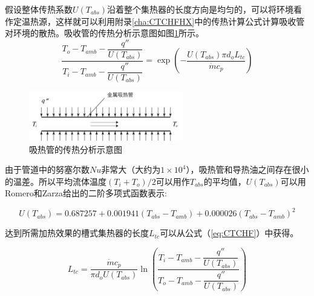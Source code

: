 
假设整体传热系数$U(T_{abs})$沿着整个集热器的长度方向是均匀的，可以将环境看作定温热源，这样就可以利用附录\ref{cha:CTCHFHX}中的传热计算公式计算吸收管对环境的散热。吸收管的传热分析示意图如图\ref{fig:Pipe}所示。
\begin{equation}
	\frac{T_{o}-T_{amb}-\dfrac{q''}{U(T_{abs})}}{T_{i}-T_{amb}-\dfrac{q''}{U(T_{abs})}}=\exp(-\frac{U(T_{abs})\pi d_o L_{tc}}{\dot{m}c_{p}})\label{eq:CTCHF}
\end{equation}

\begin{figure}[!ht]
\centering
\includegraphics[width=0.6\textwidth]{fig/Pipe.pdf}
\caption{吸热管的传热分析示意图}\label{fig:Pipe}
\end{figure}

由于管道中的努塞尔数$Nu$非常大（大约为$1\times10^4$），吸热管和导热油之间存在很小的温差。所以平均流体温度$(T_{i}+T_{o})/2$可以用作$T_{abs}$的平均值，$U(T_{abs})$可以用Romero和Zarza给出的二阶多项式函数表示\cite{Romero2007}:

\begin{equation}
	U(T_{abs}) = 0.687257 + 0.001941(T_{abs} - T_{amb}) + 0.000026(T_{abs} - T_{amb})^2
\end{equation}

达到所需加热效果的槽式集热器的长度$L_{tc}$可以从公式（\ref{eq:CTCHF}）中获得。

\begin{equation}
	L_{tc} = \dfrac{\dot{m}c_p}{\pi d_o U(T_{abs})}\ln\left(\dfrac{T_i-T_{amb}-\dfrac{q''}{U(T_{abs})}}{T_o-T_{amb}-\dfrac{q''}{U(T_{abs})}}\right)
	\label{eq:get_L}
\end{equation}

